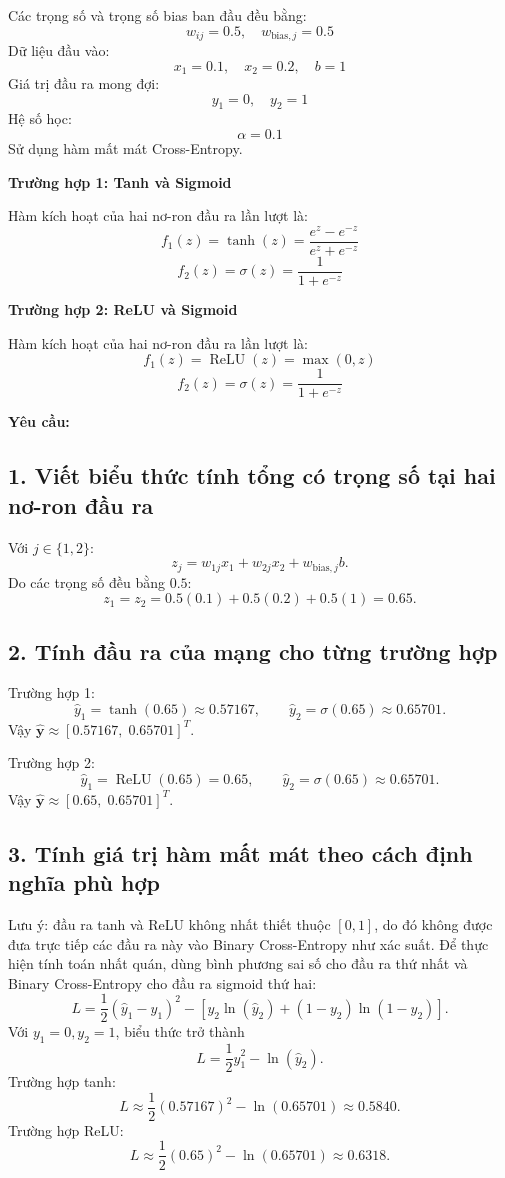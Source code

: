 \documentclass[12pt,a4paper]{article}
\begin{document}
Các trọng số và trọng số bias ban đầu đều bằng:
\[
w_{ij}=0.5,\quad w_{\mathrm{bias},j}=0.5
\]
Dữ liệu đầu vào:
\[
x_1=0.1,\quad x_2=0.2,\quad b=1
\]
Giá trị đầu ra mong đợi:
\[
y_1=0,\quad y_2=1
\]
Hệ số học:
\[
\alpha=0.1
\]
Sử dụng hàm mất mát Cross-Entropy.

\textbf{Trường hợp 1: Tanh và Sigmoid}

Hàm kích hoạt của hai nơ-ron đầu ra lần lượt là:
\[
f_1(z)=\tanh(z)=\frac{e^z-e^{-z}}{e^z+e^{-z}}
\]
\[
f_2(z)=\sigma(z)=\frac{1}{1+e^{-z}}
\]

\textbf{Trường hợp 2: ReLU và Sigmoid}

Hàm kích hoạt của hai nơ-ron đầu ra lần lượt là:
\[
f_1(z)=\operatorname{ReLU}(z)=\max(0,z)
\]
\[
f_2(z)=\sigma(z)=\frac{1}{1+e^{-z}}
\]

\textbf{Yêu cầu:}

\subsection*{1. Viết biểu thức tính tổng có trọng số tại hai nơ-ron đầu ra}

 Với $j\in\{1,2\}$:
\[
z_j=w_{1j}x_1+w_{2j}x_2+w_{\mathrm{bias},j}b.
\]
Do các trọng số đều bằng $0.5$:
\[
z_1=z_2=0.5(0.1)+0.5(0.2)+0.5(1)=0.65.
\]

\subsection*{2. Tính đầu ra của mạng cho từng trường hợp}

 Trường hợp 1:
\[
\hat y_1=\tanh(0.65)\approx0.57167,\qquad
\hat y_2=\sigma(0.65)\approx0.65701.
\]
Vậy $\hat{\mathbf y}\approx[0.57167,\;0.65701]^T$.

Trường hợp 2:
\[
\hat y_1=\operatorname{ReLU}(0.65)=0.65,\qquad
\hat y_2=\sigma(0.65)\approx0.65701.
\]
Vậy $\hat{\mathbf y}\approx[0.65,\;0.65701]^T$.

\subsection*{3. Tính giá trị hàm mất mát theo cách định nghĩa phù hợp}

 Lưu ý: đầu ra tanh và ReLU không nhất thiết thuộc $[0,1]$, do đó không được đưa trực tiếp các đầu ra này vào Binary Cross-Entropy như xác suất. Để thực hiện tính toán nhất quán, dùng bình phương sai số cho đầu ra thứ nhất và Binary Cross-Entropy cho đầu ra sigmoid thứ hai:
\[
L=\frac12(\hat y_1-y_1)^2-
\left[y_2\ln(\hat y_2)+(1-y_2)\ln(1-\hat y_2)\right].
\]
Với $y_1=0,y_2=1$, biểu thức trở thành
\[
L=\frac12\hat y_1^2-\ln(\hat y_2).
\]
Trường hợp tanh:
\[
L\approx\frac12(0.57167)^2-\ln(0.65701)\approx0.5840.
\]
Trường hợp ReLU:
\[
L\approx\frac12(0.65)^2-\ln(0.65701)\approx0.6318.
\]
\end{document}
